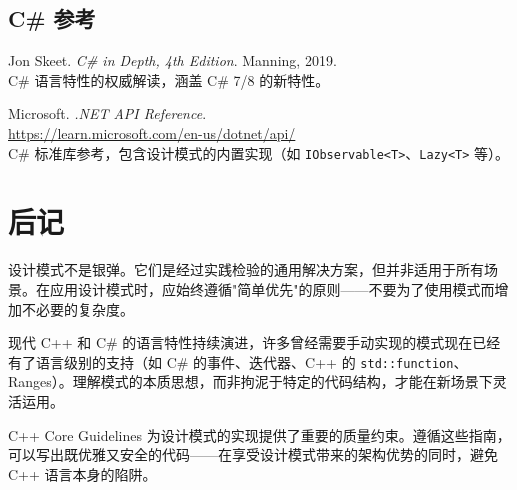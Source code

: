 \documentclass[12pt,a4paper,fontset=fandol]{ctexbook}
\begin{document}
\section*{C\# 参考}

\begin{enumerate}[label=\textbf{[\arabic*]}, start=7]
  \item Jon Skeet. \textit{C\# in Depth, 4th Edition}. Manning, 2019.\\
  C\# 语言特性的权威解读，涵盖 C\# 7/8 的新特性。

  \item Microsoft. \textit{.NET API Reference}.\\
  \href{https://learn.microsoft.com/en-us/dotnet/api/}{https://learn.microsoft.com/en-us/dotnet/api/}\\
  C\# 标准库参考，包含设计模式的内置实现（如 \texttt{IObservable<T>}、\texttt{Lazy<T>} 等）。
\end{enumerate}

\backmatter

\chapter{后记}

设计模式不是银弹。它们是经过实践检验的通用解决方案，但并非适用于所有场景。在应用设计模式时，应始终遵循"简单优先"的原则——不要为了使用模式而增加不必要的复杂度。

现代 C++ 和 C\# 的语言特性持续演进，许多曾经需要手动实现的模式现在已经有了语言级别的支持（如 C\# 的事件、迭代器、C++ 的 \texttt{std::function}、Ranges）。理解模式的本质思想，而非拘泥于特定的代码结构，才能在新场景下灵活运用。

C++ Core Guidelines 为设计模式的实现提供了重要的质量约束。遵循这些指南，可以写出既优雅又安全的代码——在享受设计模式带来的架构优势的同时，避免 C++ 语言本身的陷阱。

\printindex
\end{document}
